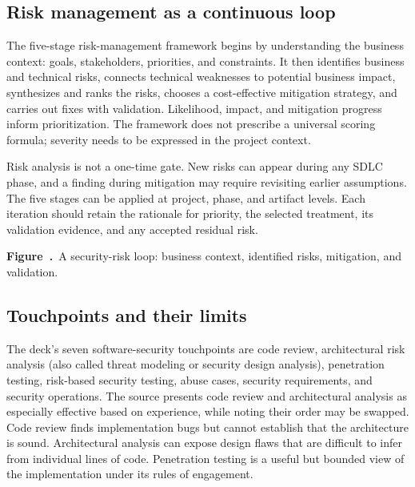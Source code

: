 \documentclass[11pt,a4paper]{article}
\numberwithin{figure}{section}
\newcommand{\diagramcaption}[1]{\par\smallskip\refstepcounter{figure}\begin{center}\small\textbf{Figure~\thefigure.}~#1\end{center}}
\begin{document}
\subsection{Risk management as a continuous loop}
The five-stage risk-management framework begins by understanding the business context: goals, stakeholders, priorities, and constraints. It then identifies business and technical risks, connects technical weaknesses to potential business impact, synthesizes and ranks the risks, chooses a cost-effective mitigation strategy, and carries out fixes with validation. Likelihood, impact, and mitigation progress inform prioritization. The framework does not prescribe a universal scoring formula; severity needs to be expressed in the project context.

Risk analysis is not a one-time gate. New risks can appear during any SDLC phase, and a finding during mitigation may require revisiting earlier assumptions. The five stages can be applied at project, phase, and artifact levels. Each iteration should retain the rationale for priority, the selected treatment, its validation evidence, and any accepted residual risk.

\begin{center}\end{center}
\diagramcaption{A security-risk loop: business context, identified risks, mitigation, and validation.}

\subsection{Touchpoints and their limits}
The deck's seven software-security touchpoints are code review, architectural risk analysis (also called threat modeling or security design analysis), penetration testing, risk-based security testing, abuse cases, security requirements, and security operations. The source presents code review and architectural analysis as especially effective based on experience, while noting their order may be swapped. Code review finds implementation bugs but cannot establish that the architecture is sound. Architectural analysis can expose design flaws that are difficult to infer from individual lines of code. Penetration testing is a useful but bounded view of the implementation under its rules of engagement.
\end{document}

